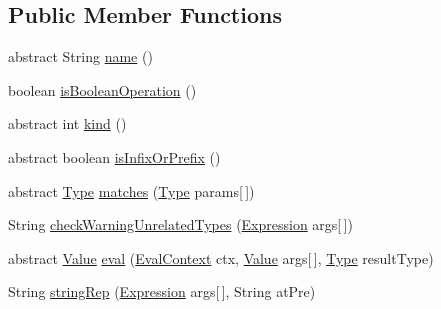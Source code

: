 \subsection*{Public Member Functions}
\begin{DoxyCompactItemize}
\item 
abstract String \hyperlink{classorg_1_1tzi_1_1use_1_1uml_1_1ocl_1_1expr_1_1operations_1_1_op_generic_a3e9ec221ff4b50fd7db10f79ec844107}{name} ()
\item 
boolean \hyperlink{classorg_1_1tzi_1_1use_1_1uml_1_1ocl_1_1expr_1_1operations_1_1_op_generic_a11e3a4dc9436300fcd0f4286b381e36f}{is\-Boolean\-Operation} ()
\item 
abstract int \hyperlink{classorg_1_1tzi_1_1use_1_1uml_1_1ocl_1_1expr_1_1operations_1_1_op_generic_a13e911031cc8b2d960bd9053594a8c7c}{kind} ()
\item 
abstract boolean \hyperlink{classorg_1_1tzi_1_1use_1_1uml_1_1ocl_1_1expr_1_1operations_1_1_op_generic_ad93cdbd9972ee740f5ba9331a9ad4c1b}{is\-Infix\-Or\-Prefix} ()
\item 
abstract \hyperlink{interfaceorg_1_1tzi_1_1use_1_1uml_1_1ocl_1_1type_1_1_type}{Type} \hyperlink{classorg_1_1tzi_1_1use_1_1uml_1_1ocl_1_1expr_1_1operations_1_1_op_generic_a9328e9b29678aa3a495023a4e30983ff}{matches} (\hyperlink{interfaceorg_1_1tzi_1_1use_1_1uml_1_1ocl_1_1type_1_1_type}{Type} params\mbox{[}$\,$\mbox{]})
\item 
String \hyperlink{classorg_1_1tzi_1_1use_1_1uml_1_1ocl_1_1expr_1_1operations_1_1_op_generic_ae473058d817dd0c6b0a940d7d6a14cbc}{check\-Warning\-Unrelated\-Types} (\hyperlink{classorg_1_1tzi_1_1use_1_1uml_1_1ocl_1_1expr_1_1_expression}{Expression} args\mbox{[}$\,$\mbox{]})
\item 
abstract \hyperlink{classorg_1_1tzi_1_1use_1_1uml_1_1ocl_1_1value_1_1_value}{Value} \hyperlink{classorg_1_1tzi_1_1use_1_1uml_1_1ocl_1_1expr_1_1operations_1_1_op_generic_a76a9959ecbc69c69e05f4745ced50649}{eval} (\hyperlink{classorg_1_1tzi_1_1use_1_1uml_1_1ocl_1_1expr_1_1_eval_context}{Eval\-Context} ctx, \hyperlink{classorg_1_1tzi_1_1use_1_1uml_1_1ocl_1_1value_1_1_value}{Value} args\mbox{[}$\,$\mbox{]}, \hyperlink{interfaceorg_1_1tzi_1_1use_1_1uml_1_1ocl_1_1type_1_1_type}{Type} result\-Type)
\item 
String \hyperlink{classorg_1_1tzi_1_1use_1_1uml_1_1ocl_1_1expr_1_1operations_1_1_op_generic_aa6c77fb4ca8ba5a2361a96c7f1ea96bf}{string\-Rep} (\hyperlink{classorg_1_1tzi_1_1use_1_1uml_1_1ocl_1_1expr_1_1_expression}{Expression} args\mbox{[}$\,$\mbox{]}, String at\-Pre)
\end{DoxyCompactItemize}
